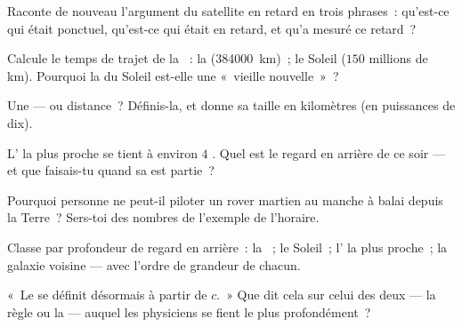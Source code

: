 \begin{exercise}[$\star$]\label{exo:g8:speed-of-light:2}
Raconte de nouveau l'argument du satellite en retard en trois
phrases~: qu'est-ce qui était ponctuel, qu'est-ce qui était en
retard, et qu'a mesuré ce retard~?
\end{exercise}

\begin{exercise}[$\star$]\label{exo:g8:speed-of-light:3}
Calcule le temps de trajet de la ~: la 
(\qty{384000}{km})~; le Soleil ($150$ millions de km). Pourquoi la
 du Soleil est-elle une «~vieille nouvelle~»~?
\end{exercise}

\begin{exercise}[$\star$]\label{exo:g8:speed-of-light:4}
Une  ---  ou distance~? Définis-la, et donne sa
taille en kilomètres (en puissances de dix).
\end{exercise}

\begin{exercise}[$\star$]\label{exo:g8:speed-of-light:5}
L' la plus proche se tient à environ $4$ . Quel
est le regard en arrière de ce soir --- et que faisais-tu quand sa
 est partie~?
\end{exercise}

\begin{exercise}[$\star$]\label{exo:g8:speed-of-light:6}
Pourquoi personne ne peut-il piloter un rover martien au manche à
balai depuis la Terre~? Sers-toi des nombres de l'exemple de
l'horaire.
\end{exercise}

\begin{exercise}[$\star$]\label{exo:g8:speed-of-light:7}
Classe par profondeur de regard en arrière~: la ~; le Soleil~;
l' la plus proche~; la galaxie voisine --- avec l'ordre de
grandeur de chacun.
\end{exercise}

\begin{exercise}[$\star$]\label{exo:g8:speed-of-light:8}
«~Le  se définit désormais à partir de $c$.~» Que dit cela sur
celui des deux --- la règle ou la  --- auquel les physiciens se
fient le plus profondément~?
\end{exercise}

